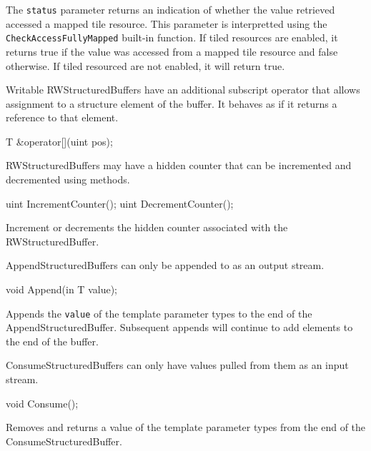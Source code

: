 The \texttt{status} parameter returns an indication of whether the value retrieved accessed a mapped tile
resource. This parameter is interpretted using the \texttt{CheckAccessFullyMapped}
built-in function. If tiled resources are enabled, it returns true if the value was accessed from a mapped
tile resource and false otherwise. If tiled resourced are not enabled, it will return true.

Writable RWStructuredBuffers have an additional subscript operator that allows assignment to a structure element of the buffer.
It behaves as if it returns a reference to that element.
\begin{HLSL}
 T &operator[](uint pos);
\end{HLSL}


RWStructuredBuffers may have a hidden counter that can be incremented and decremented using methods.

\begin{HLSL}
   uint IncrementCounter();
   uint DecrementCounter();
\end{HLSL}

Increment or decrements the hidden counter associated with the RWStructuredBuffer.


AppendStructuredBuffers can only be appended to as an output stream.

\begin{HLSL}
   void Append(in T value);
\end{HLSL}

Appends the \texttt{value} of the template parameter types to the end of the AppendStructuredBuffer.
Subsequent appends will continue to add elements to the end of the buffer.


ConsumeStructuredBuffers can only have values pulled from them as an input stream.

\begin{HLSL}
   void Consume();
\end{HLSL}

Removes and returns a value of the template parameter types from the end of the ConsumeStructuredBuffer.




